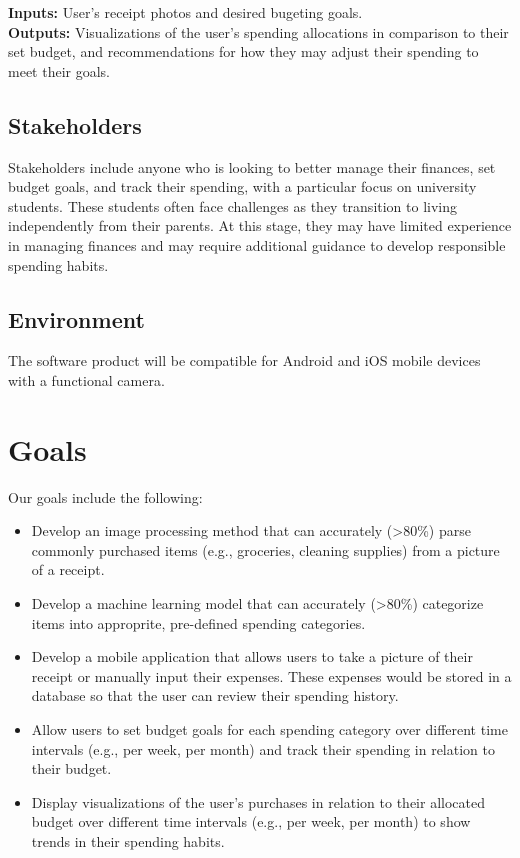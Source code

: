 \documentclass{article}
\begin{document}

\textbf{Inputs:} User's receipt photos and desired bugeting goals.\\
\textbf{Outputs:} Visualizations of the user's spending allocations in
comparison to their set budget, and recommendations for how they may adjust
their spending to meet their goals.

\subsection{Stakeholders}

Stakeholders include anyone who is looking to better manage their finances, set
budget goals, and track their spending, with a particular focus on university
students. These students often face challenges as they transition to living
independently from their parents. At this stage, they may have limited
experience in managing finances and may require additional guidance to develop
responsible spending habits.


\subsection{Environment}


The software product will be compatible for Android and iOS mobile devices with
a functional camera.

\section{Goals}

Our goals include the following:
\begin{itemize}
    \item Develop an image processing method that can accurately
    (\textgreater80\%) parse commonly purchased items (e.g., groceries, cleaning
    supplies) from a picture of a receipt.
    \item Develop a machine learning model that can accurately
    (\textgreater80\%) categorize items into approprite, pre-defined spending
    categories. 
    \item Develop a mobile application that allows users to take a picture of
    their receipt or manually input their expenses. These expenses would be
    stored in a database so that the user can review their spending history.
    \item Allow users to set budget goals for each spending category over
    different time intervals (e.g., per week, per month) and track their spending
    in relation to their budget.
    \item Display visualizations of the user's purchases in relation to their
    allocated budget over different time intervals (e.g., per week, per month)
    to show trends in their spending habits.
\end{itemize}
\end{document}
